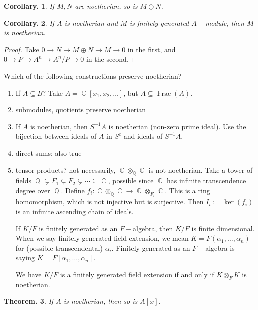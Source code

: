 \documentclass[11pt, a4paper]{memoir}
\DeclareMathOperator{\Q}{{\mathbb{Q}}}
\DeclareMathOperator{\C}{{\mathbb{C}}}
\theoremstyle{change}
\newtheorem{theorem}{Theorem.}[section]
\newtheorem{corollary}[theorem]{Corollary.}
\theoremstyle{plain}
\theoremstyle{nonumberplain}
\newtheorem{proof}{Proof}
\DeclareMathOperator{\Frac}{Frac}
\numberwithin{equation}{section}
\begin{document}
\begin{corollary}
    If $M,N$ are noetherian, so is $M\oplus N$.
\end{corollary}
\begin{corollary}
    If $A$ is noetherian and $M$ is finitely generated $A-$module, then $M$ is noetherian.
\end{corollary}
\begin{proof}
    Take $0\to N\to M\oplus N\to M\to 0$ in the first, and $0\to P\to A^n\to A^n/P\to 0$ in the second.
\end{proof}
Which of the following constructions preserve noetherian?
\begin{enumerate}[nolistsep]
    \item If $A\subseteq B$?
        Take $A=\C[x_1,x_2,\ldots]$, but $A\subseteq\Frac(A)$.
    \item submodules, quotients preserve noetherian
    \item If $A$ is noetherian, then $S^{-1}A$ is noetherian (non-zero prime ideal).
        Use the bijection between ideals of $A$ in $S^c$ and ideals of $S^{-1}A$.
    \item direct sums: also true
    \item tensor products? not necessarily, $\C\otimes_{\Q}\C$ is not noetherian.
        Take a tower of fields $\Q\subsetneq F_1\subsetneq F_2\subsetneq\cdots\subseteq\C$, possible since $\C$ has infinite transcendence degree over $\Q$.
        Define $f_i:\C\otimes_{\Q}\C\to\C\otimes_{F_i}\C$.
        This is a ring homomorphism, which is not injective but is surjective.
        Then $I_i:=\ker(f_i)$ is an infinite ascending chain of ideals.

        If $K/F$ is finitely generated as an $F-$algebra, then $K/F$ is finite dimensional.
        When we say finitely generated field extension, we mean $K=F(\alpha_1,\ldots,\alpha_n)$ for (possible transcendental) $\alpha_i$.
        Finitely generated as an $F-$algebra is saying $K=F[\alpha_1,\ldots,\alpha_n]$.

        We have $K/F$ is a finitely generated field extension if and only if $K\otimes_F K$ is noetherian.
\end{enumerate}
\begin{theorem}
    If $A$ is noetherian, then so is $A[x]$.
\end{theorem}
\end{document}

